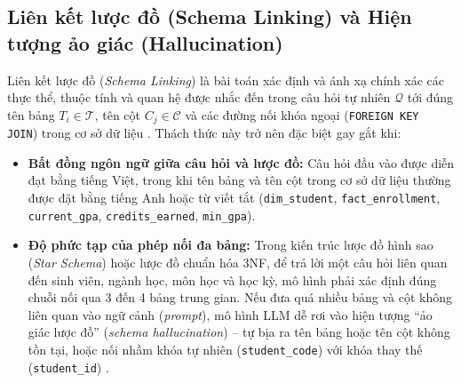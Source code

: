 \documentclass[12pt,a4paper]{report}
\begin{document}
\subsection{Liên kết lược đồ (Schema Linking) và Hiện tượng ảo giác (Hallucination)}
Liên kết lược đồ (\textit{Schema Linking}) là bài toán xác định và ánh xạ chính xác các thực thể, thuộc tính và quan hệ được nhắc đến trong câu hỏi tự nhiên $\mathcal{Q}$ tới đúng tên bảng $T_i \in \mathcal{T}$, tên cột $C_j \in \mathcal{C}$ và các đường nối khóa ngoại (\texttt{FOREIGN KEY JOIN}) trong cơ sở dữ liệu \cite{wang2020ratsql, wang2025macsql}. Thách thức này trở nên đặc biệt gay gắt khi:
\begin{itemize}
    \item \textbf{Bất đồng ngôn ngữ giữa câu hỏi và lược đồ:} Câu hỏi đầu vào được diễn đạt bằng tiếng Việt, trong khi tên bảng và tên cột trong cơ sở dữ liệu thường được đặt bằng tiếng Anh hoặc từ viết tắt (\texttt{dim\_student}, \texttt{fact\_enrollment}, \texttt{current\_gpa}, \texttt{credits\_earned}, \texttt{min\_gpa}).
    \item \textbf{Độ phức tạp của phép nối đa bảng:} Trong kiến trúc lược đồ hình sao (\textit{Star Schema}) hoặc lược đồ chuẩn hóa 3NF, để trả lời một câu hỏi liên quan đến sinh viên, ngành học, môn học và học kỳ, mô hình phải xác định đúng chuỗi nối qua 3 đến 4 bảng trung gian. Nếu đưa quá nhiều bảng và cột không liên quan vào ngữ cảnh (\textit{prompt}), mô hình LLM dễ rơi vào hiện tượng ``ảo giác lược đồ'' (\textit{schema hallucination}) -- tự bịa ra tên bảng hoặc tên cột không tồn tại, hoặc nối nhầm khóa tự nhiên (\texttt{student\_code}) với khóa thay thế (\texttt{student\_id}) \cite{wang2025macsql, chen2025enterprise}.
\end{itemize}
\end{document}
